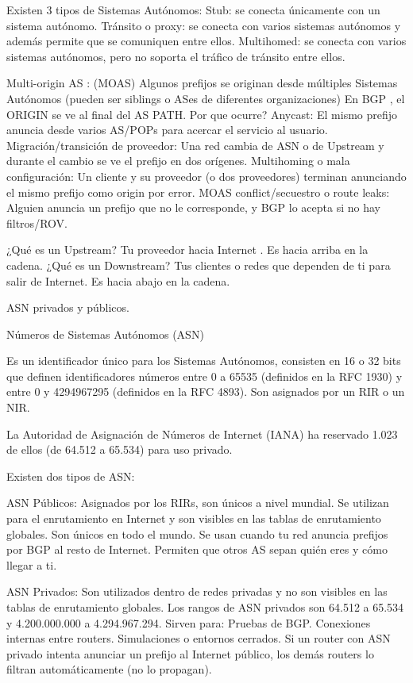 Existen 3 tipos de Sistemas Autónomos:
Stub: se conecta únicamente con un sistema autónomo.
Tránsito o proxy: se conecta con varios sistemas autónomos y además permite que se comuniquen entre ellos.
Multihomed: se conecta con varios sistemas autónomos, pero no soporta el tráfico de tránsito entre ellos.


Multi-origin AS : (MOAS) Algunos prefijos se originan desde múltiples Sistemas Autónomos (pueden ser siblings o ASes de diferentes organizaciones)
En BGP , el ORIGIN se ve al final del AS PATH.
Por que ocurre?
Anycast: El mismo prefijo anuncia desde varios AS/POPs para acercar el servicio al usuario.
Migración/transición de proveedor: Una red cambia de ASN o de Upstream y durante el cambio se ve el prefijo en dos orígenes.
Multihoming o mala configuración: Un cliente y su proveedor (o dos proveedores) terminan anunciando el mismo prefijo como origin por error.
MOAS conflict/secuestro o route leaks: Alguien anuncia un prefijo que no le corresponde, y BGP lo acepta si no hay filtros/ROV.


¿Qué es un Upstream?
Tu proveedor hacia Internet . Es hacia arriba en la cadena.
¿Qué es un Downstream?
Tus clientes o redes que dependen de ti para salir de Internet. Es hacia abajo en la cadena.

ASN privados y públicos.

Números de Sistemas Autónomos (ASN)

Es un identificador único para los Sistemas Autónomos, consisten en 16 o 32 bits  que definen identificadores números entre 0 a 65535 (definidos en la RFC 1930) y entre 0 y  4294967295 (definidos en la RFC 4893). Son asignados por un RIR o un NIR.

La Autoridad de Asignación de Números de Internet (IANA) ha reservado 1.023 de ellos (de 64.512 a 65.534) para uso privado. 

Existen dos tipos de ASN:

ASN Públicos:  Asignados por los  RIRs, son únicos a nivel mundial. Se utilizan para el enrutamiento en Internet y son visibles en las tablas de enrutamiento globales.
Son únicos en todo el mundo.
Se usan cuando tu red anuncia prefijos por BGP al resto de Internet.
Permiten que otros AS sepan quién eres y cómo llegar a ti.

ASN Privados: Son utilizados dentro de redes privadas y no son visibles en las tablas de enrutamiento globales. Los rangos de ASN privados son 64.512 a 65.534 y 4.200.000.000 a 4.294.967.294.
Sirven para:
Pruebas de BGP.
Conexiones internas entre routers.
Simulaciones o entornos cerrados.
	Si un router con ASN privado intenta anunciar un prefijo al Internet público, los 
demás routers lo filtran automáticamente (no lo propagan).


